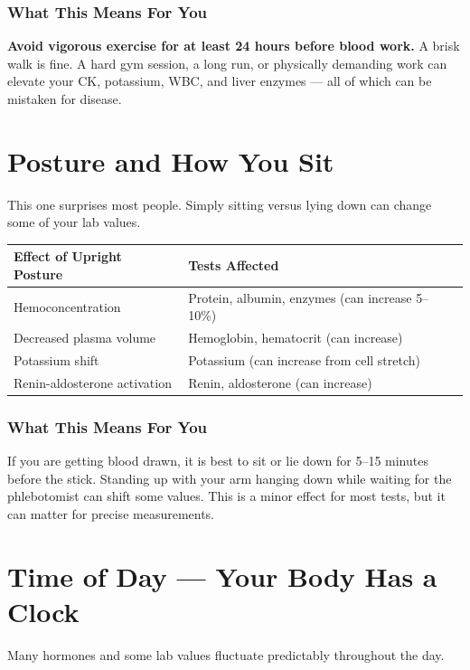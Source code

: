 \subsubsection{What This Means For You}

\textbf{Avoid vigorous exercise for at least 24 hours before blood work.} A brisk walk is fine. A hard gym session, a long run, or physically demanding work can elevate your CK, potassium, WBC, and liver enzymes --- all of which can be mistaken for disease.

\clearpage
\section{Posture and How You Sit}

This one surprises most people. Simply sitting versus lying down can change some of your lab values.

\begin{longtable}{@{}p{4.5cm}p{10.5cm}@{}}
\toprule
\textbf{Effect of Upright Posture} & \textbf{Tests Affected} \\
\midrule
Hemoconcentration & Protein, albumin, enzymes (can increase 5--10\%) \\
Decreased plasma volume & Hemoglobin, hematocrit (can increase) \\
Potassium shift & Potassium (can increase from cell stretch) \\
Renin-aldosterone activation & Renin, aldosterone (can increase) \\
\bottomrule
\end{longtable}

\subsubsection{What This Means For You}

If you are getting blood drawn, it is best to sit or lie down for 5--15 minutes before the stick. Standing up with your arm hanging down while waiting for the phlebotomist can shift some values. This is a minor effect for most tests, but it can matter for precise measurements.

\clearpage
\section{Time of Day --- Your Body Has a Clock}

Many hormones and some lab values fluctuate predictably throughout the day.

